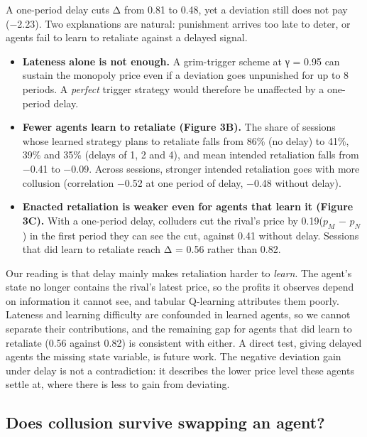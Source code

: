 \documentclass[11pt,a4paper]{article}
\providecommand{\tightlist}{\setlength{\itemsep}{1pt}\setlength{\parskip}{0pt}}
\begin{document}
A one-period delay cuts Δ from 0.81 to 0.48, yet a deviation still does not pay (−2.23). Two explanations are natural: punishment arrives too late to deter, or agents fail to learn to retaliate against a delayed signal.

\begin{itemize}
\tightlist
\item
  \textbf{Lateness alone is not enough.} A grim-trigger scheme at γ = 0.95 can sustain the monopoly price even if a deviation goes unpunished for up to 8 periods. A \emph{perfect} trigger strategy would therefore be unaffected by a one-period delay.
\item
  \textbf{Fewer agents learn to retaliate (Figure 3B).} The share of sessions whose learned strategy plans to retaliate falls from 86\% (no delay) to 41\%, 39\% and 35\% (delays of 1, 2 and 4), and mean intended retaliation falls from −0.41 to −0.09. Across sessions, stronger intended retaliation goes with more collusion (correlation −0.52 at one period of delay, −0.48 without delay).
\item
  \textbf{Enacted retaliation is weaker even for agents that learn it (Figure 3C).} With a one-period delay, colluders cut the rival's price by 0.19(\(p_{M}\) − \(p_{N}\)) in the first period they can see the cut, against 0.41 without delay. Sessions that did learn to retaliate reach Δ = 0.56 rather than 0.82.
\end{itemize}

Our reading is that delay mainly makes retaliation harder to \emph{learn}. The agent's state no longer contains the rival's latest price, so the profits it observes depend on information it cannot see, and tabular Q-learning attributes them poorly. Lateness and learning difficulty are confounded in learned agents, so we cannot separate their contributions, and the remaining gap for agents that did learn to retaliate (0.56 against 0.82) is consistent with either. A direct test, giving delayed agents the missing state variable, is future work. The negative deviation gain under delay is not a contradiction: it describes the lower price level these agents settle at, where there is less to gain from deviating.

\hypertarget{does-collusion-survive-swapping-an-agent}{%
\subsection{Does collusion survive swapping an agent?}\label{does-collusion-survive-swapping-an-agent}}
\end{document}
